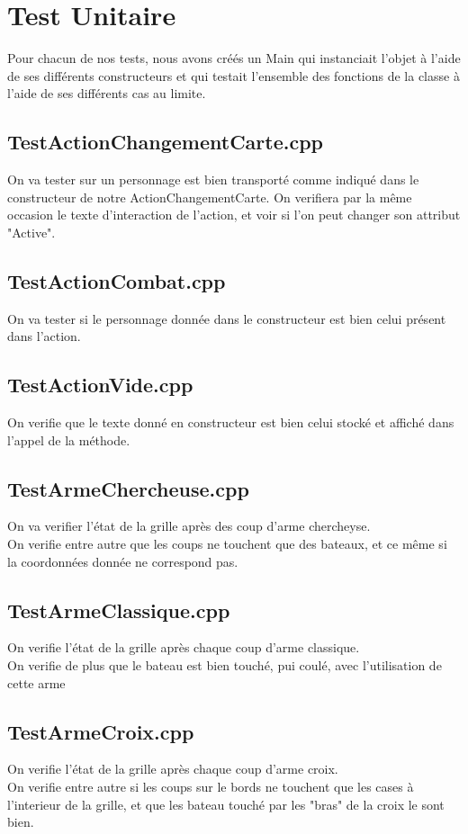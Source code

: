 \chapter{Test Unitaire}
    Pour chacun de nos tests, nous avons créés un Main qui instanciait l'objet à l'aide de ses différents constructeurs et qui testait l'ensemble des fonctions de la classe à l'aide de ses différents cas au limite.
    \section{TestActionChangementCarte.cpp}
        On va tester sur un personnage est bien transporté comme indiqué dans le constructeur de notre ActionChangementCarte. On verifiera par la même occasion le texte d'interaction de l'action, et voir si l'on peut changer son attribut "Active".
    \section{TestActionCombat.cpp}
        On va tester si le personnage donnée dans le constructeur est bien celui présent dans l'action.
    \section{TestActionVide.cpp}
        On verifie que le texte donné en constructeur est bien celui stocké et affiché dans l'appel de la méthode.
    \section{TestArmeChercheuse.cpp}
        On va verifier l'état de la grille après des coup d'arme chercheyse.\\
        On verifie entre autre que les coups ne touchent que des bateaux, et ce même si la coordonnées donnée ne correspond pas.
    \section{TestArmeClassique.cpp}
        On verifie l'état de la grille après chaque coup d'arme classique.\\
        On verifie de plus que le bateau est bien touché, pui coulé, avec l'utilisation de cette arme
    \section{TestArmeCroix.cpp}
        On verifie l'état de la grille après chaque coup d'arme croix.\\
        On verifie entre autre si les coups sur le bords ne touchent que les cases à l'interieur de la grille, et que les bateau touché par les "bras" de la croix le sont bien.
